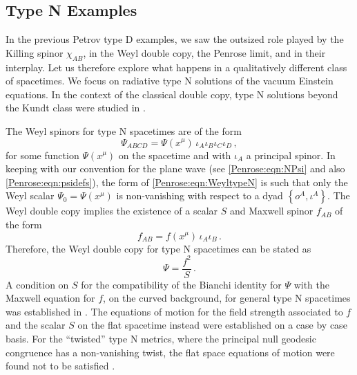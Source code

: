 \subsection{Type N Examples} \label{Penrose:sec:typeN}

In the previous Petrov type D examples, we saw the outsized role played by the Killing spinor $\chi_{AB}$, in the
Weyl double copy, the Penrose limit, and in their interplay. Let us therefore explore what happens in a
qualitatively different class of spacetimes. We focus on radiative type N solutions of the vacuum Einstein
equations. In the context of the classical double copy, type N solutions beyond the Kundt class were studied in \cite{Godazgar:2020zbv}. 

The Weyl spinors for type N spacetimes are of the form
\begin{equation}\label{Penrose:eqn:WeyltypeN}
\Psi_{ABCD} = \Psi(x^{\mu}) \, \iota_A \iota_B \iota_C \iota_D \, ,
\end{equation}
for some function $\Psi(x^{\mu})$ on the spacetime and with $\iota_A$ a principal spinor. In keeping with our convention for the plane wave (see \eqref{Penrose:eqn:NPsi} and also \eqref{Penrose:eqn:psidefs}), the form of \eqref{Penrose:eqn:WeyltypeN} is such that only the Weyl scalar $\Psi_0 = \Psi(x^{\mu})$ is non-vanishing with respect to a dyad $\left\lbrace o^A, \iota^A \right\rbrace$. The Weyl double copy implies the existence of a scalar $S$ and Maxwell spinor $f_{AB}$ of the form
\begin{equation}\label{Penrose:eqn:ftypeN}
f_{AB} = f(x^{\mu}) \, \iota_A \iota_B \, . 
\end{equation}
Therefore, the Weyl double copy for type N spacetimes can be stated as
\begin{equation}\label{Penrose:eqn:typeNdc}
\Psi = \frac{f^2}{S} \, .
\end{equation}
A condition on $S$ for the compatibility of the Bianchi identity for $\Psi$ with the Maxwell equation for $f$, on the curved background, for general type N spacetimes was established in \cite{Godazgar:2020zbv}. The equations of motion for the field strength associated to $f$ and the scalar $S$ on the flat spacetime instead were established on a case by case basis. For the ``twisted'' type N metrics, where the principal null geodesic congruence has a non-vanishing twist, the flat space equations of motion were found not to be satisfied \cite{Godazgar:2020zbv}.

